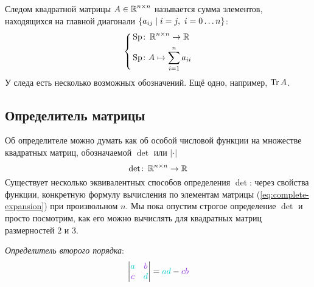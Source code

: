 \documentclass[a4paper,12pt]{article}
\theoremstyle{remark}
\begin{document}
  \begin{definition}
    Следом квадратной матрицы $A \in \operatorname{\mathbb R}^{n \times n}$ называется сумма элементов, находящихся на главной диагонали $\{a_{ij} \hm\mid i = j,\ i = 0 \ldots n\}$:
    \[
      \left\{
        \begin{aligned}
          &\operatorname{Sp} \colon \operatorname{\mathbb R}^{n \times n} \to \operatorname{\mathbb R}\\
          &\operatorname{Sp} \colon A \mapsto \sum_{i = 1}^n a_{ii}
        \end{aligned}
      \right.
    \]
    У следа есть несколько возможных обозначений.
    Ещё одно, например, $\operatorname{Tr} A$.
  \end{definition}


  \subsection{Определитель матрицы}
  
  Об определителе можно думать как об особой числовой функции на множестве квадратных матриц, обозначаемой $\det$ или $|\cdot|$
  \[
    \det \colon \operatorname{\mathbb R}^{n\times n} \to \operatorname{\mathbb R}
  \]
  Существует несколько эквивалентных способов определения $\det$: через свойства функции, конкретную формулу вычисления по элементам матрицы (\ref{eq:complete-expansion}) при произвольном $n$.
  Мы пока опустим строгое определение $\det$ и просто посмотрим, как его можно вычислять для квадратных матриц размерностей $2$ и $3$.
  
  \emph{Определитель второго порядка}:
  \[
    \begin{vmatrix}
      \textcolor{light-cyan}{a}   & \textcolor{light-purple}{b} \\
      \textcolor{light-purple}{c} & \textcolor{light-cyan}{d} 
    \end{vmatrix} = \textcolor{light-cyan}{a} \textcolor{light-cyan}{d}  - \textcolor{light-purple}{c} \textcolor{light-purple}{b}
  \]
\end{document}
